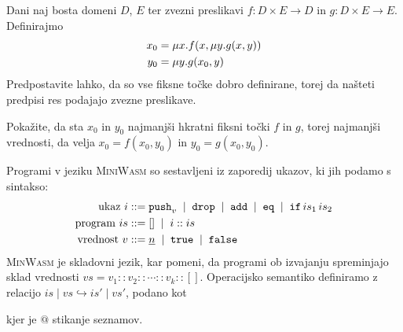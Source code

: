 \documentclass[arhiv]{../izpit}
\begin{document}
\podnaloga[\tocke{15}]
Dani naj bosta domeni $D$, $E$ ter zvezni preslikavi $f \colon D \times E \to D$ in $g \colon D \times E \to E$. Definirajmo
%
\begin{align*}
  x_0 & = \mu x. f(x, \mu y. g(x, y)) \\
  y_0 & = \mu y. g(x_0, y)
\end{align*}
%
Predpostavite lahko, da so vse fiksne točke dobro definirane, torej da našteti predpisi res podajajo zvezne preslikave.

Pokažite, da sta $x_0$ in $y_0$ najmanjši hkratni fiksni točki $f$ in $g$, torej najmanjši vrednosti, da velja $x_0 = f(x_0, y_0)$ in $y_0 = g(x_0, y_0)$.

\nadaljevanje


\naloga[\tocke{20}]

Programi v jeziku \textsc{MiniWasm} so sestavljeni iz zaporedij ukazov, ki jih podamo s sintakso:
\begin{align*}
  \text{ukaz $i$} \mathrel{{:}{:}{=}} {}
   & \mathtt{push}_v \;\mid\;
   \mathtt{drop} \;\mid\;
  \mathtt{add} \;\mid\;
  \mathtt{eq} \;\mid\;
  \mathtt{if} \, is_1 \, is_2 \\
  \text{program $is$} \mathrel{{:}{:}{=}} {}
   & [] \;\mid\;
  i :: is                     \\
  \text{vrednost $v$} \mathrel{{:}{:}{=}} {}
   & \underline{n} \;\mid\;
  \mathtt{true} \;\mid\;
  \mathtt{false}
\end{align*}
%
\textsc{MinWasm} je skladovni jezik, kar pomeni, da programi ob izvajanju spreminjajo sklad vrednosti $vs = v_1 :: v_2 :: \cdots :: v_k :: []$.
Operacijsko semantiko definiramo z relacijo $is \mid vs \hookrightarrow is' \mid vs'$, podano kot
%
%
kjer je $@$ stikanje seznamov.
\end{document}
